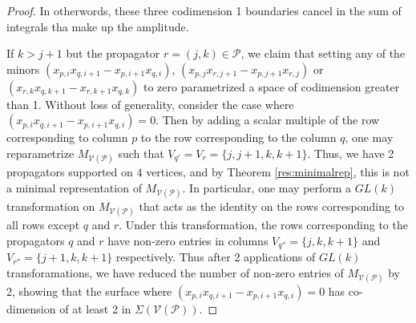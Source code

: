 \documentclass[11pt]{article}
\newcommand{\drawWLD}[2]{

\pgfmathsetmacro{\n}{#1}
\pgfmathsetmacro{\radius}{#2}
\pgfmathsetmacro{\angle}{360/\n}
\draw (0,0) circle (\radius);
    \foreach \i in {1,2,...,\n} {
      \draw (\angle*\i:\radius) node {$\bullet$};
    }

}
\newcommand{\drawprop}[4]{
\pgfmathsetmacro{\r}{#1}
\pgfmathsetmacro{\bumpr}{#2}
\pgfmathsetmacro{\s}{#3}
\pgfmathsetmacro{\bumps}{#4}
\pgfmathsetmacro{\perturbe}{\angle/\n}
\begin{scope}
\draw[smallpropagator] (\angle*\r + \angle/2 + \bumpr*\perturbe:\radius) -- (\angle*\s + \angle/2 + \bumps*\perturbe:\radius);
\end{scope}
}
\newcommand{\modifiedprop}[5]{
\pgfmathsetmacro{\r}{#1}
\pgfmathsetmacro{\bumpr}{#2}
\pgfmathsetmacro{\s}{#3}
\pgfmathsetmacro{\bumps}{#4}
\pgfmathsetmacro{\perturbe}{\angle/\n}

\begin{scope}
\clip (\angle*\r:\radius) -- (\angle + \angle*\r:\radius) -- (\angle*\s:\radius) -- (\angle + \angle*\s:\radius) -- (\angle*\r:\radius);
\draw[#5] (\angle*\r + \angle/2 + \bumpr*\perturbe:\radius) -- (\angle*\s + \angle/2 + \bumps*\perturbe:\radius);
\end{scope}
}
\newcommand{\drawnumbers}{
  \foreach \i in {1,2,...,\n} {
  \pgfmathsetmacro{\x}{\angle*\i}
  \draw (\x:\radius*1.25) node {\footnotesize \i};
}
}
\newcommand{\cP}{\mathcal{P}}
\newcommand{\cV}{\mathcal{V}}
\newcommand{\VP}{\cV(\cP)}
\theoremstyle{remark}
\theoremstyle{definition}
\begin{document}
\begin{proof}
\begin{comment}
        \drawprop{5}{0}{8}{-1}
		\end{scope}
	\end{tikzpicture} \leftrightarrow \begin{tikzpicture}[rotate=67.5,baseline=(current bounding box.east)]
	\begin{scope}
	\drawWLD{10}{1.5}
	\drawnumbers
	\modifiedprop{1}{0}{8}{1}{propagator, dashed}
	\modifiedprop{1}{0}{3}{0}{propagator, dashed}
        \drawprop{5}{0}{8}{-1}
		\end{scope}
	\end{tikzpicture} \leftrightarrow \begin{tikzpicture}[rotate=67.5,baseline=(current bounding box.east)]
	\begin{scope}
	\drawWLD{10}{1.5}
	\drawnumbers
	\modifiedprop{1}{0}{3}{0}{propagator, dashed}
	\modifiedprop{3}{0}{8}{0}{propagator, dashed}
        \drawprop{5}{0}{8}{-1}
		\end{scope}
	\end{tikzpicture}\eas \end{comment}
In otherwords, these three codimension 1 boundaries cancel in the sum of integrals tha make up the amplitude.

If $k > j+1$ but the propagator $r =  (j,k) \in \cP$, we claim that setting any of the minors $(x_{p,i}x_{q,i+1} -x_{p,i+1}x_{q,i})$, $(x_{p,j}x_{r,j+1} -x_{p,j+1}x_{r,j})$ or $(x_{r,k}x_{q,k+1} -x_{r,k+1}x_{q,k})$ to zero parametrized a space of codimension greater than 1. Without loss of generality, consider the case where $(x_{p,i}x_{q,i+1} -x_{p,i+1}x_{q,i}) = 0$. Then by adding a scalar multiple of the row corresponding to column $p$ to the row corresponding to the column $q$, one may reparametrize $M_{\VP}$ such that $V_{q'} = V_r = \{j, j+1, k, k+1\}$. Thus, we have 2 propagators supported on $4$ vertices, and by Theorem \ref{res:minimalrep}, this is not a minimal representation of $M_{\VP}$. In particular, one may perform a $GL(k)$ transformation on $M_{\VP}$ that acts as the identity on the rows corresponding to all rows except $q$ and $r$. Under this transformation, the rows corresponding to the propagators $q$ and $r$ have non-zero entries in columns $V_{q''} = \{j, k, k+1\}$ and $V_{r''} = \{j+1, k , k+1\}$ respectively. Thus after 2 applications of $GL(k)$ transforamations, we have reduced the number of non-zero entries of $M_{\VP}$ by 2, showing that the surface where $(x_{p,i}x_{q,i+1} -x_{p,i+1}x_{q,i}) = 0$ has co-dimension of at least 2 in $\Sigma(\VP)$. 


\end{proof}
\end{document}
